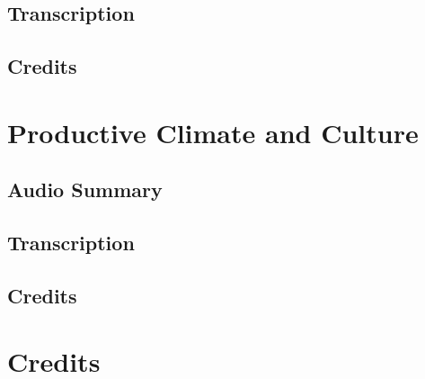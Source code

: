 \subsection{Transcription}

\subsection{Credits}

\section{Productive Climate and Culture}

\subsection{Audio Summary}

\subsection{Transcription}

\subsection{Credits}

\section{Credits}